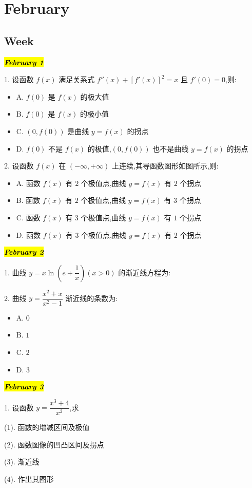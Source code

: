 \chapter{February}
\section{Week }
\hl{\textbf{\textit{February 1}}}

1. 设函数 $f(x)$ 满足关系式 $f''(x)+[f'(x)]^{2}=x$ 且 $f'(0)=0$,则:
\begin{itemize}
	\item A. $f(0)$ 是 $f(x)$ 的极大值
	\item B. $f(0)$ 是 $f(x)$ 的极小值
	\item C. $(0,f(0))$ 是曲线 $y=f(x)$ 的拐点
	\item D. $f(0)$ 不是 $f(x)$ 的极值,$(0,f(0))$ 也不是曲线 $y=f(x)$ 的拐点
\end{itemize}

2. 设函数 $f(x)$ 在 $(-\infty,+\infty)$ 上连续,其导函数图形如图所示,则:
\begin{itemize}
	\item A. 函数 $f(x)$ 有 $2$ 个极值点,曲线 $y=f(x)$ 有 $2$ 个拐点
	\item B. 函数 $f(x)$ 有 $2$ 个极值点,曲线 $y=f(x)$ 有 $3$ 个拐点
	\item C. 函数 $f(x)$ 有 $3$ 个极值点,曲线 $y=f(x)$ 有 $1$ 个拐点
	\item D. 函数 $f(x)$ 有 $3$ 个极值点,曲线 $y=f(x)$ 有 $2$ 个拐点
\end{itemize}
\hl{\textbf{\textit{February 2}}}

1. 曲线 $y=x\ln\left( e+\dfrac{1}{x}\right)(x>0) $ 的渐近线方程为:

2. 曲线 $y=\dfrac{x^{2}+x}{x^{2}-1}$ 渐近线的条数为:
\begin{itemize}
	\item A. $0$
	\item B. $1$
	\item C. $2$
	\item D. $3$
\end{itemize}
\hl{\textbf{\textit{February 3}}}

1. 设函数 $y=\dfrac{x^{3}+4}{x^{2}}$,求

(1). 函数的增减区间及极值

(2). 函数图像的凹凸区间及拐点

(3). 渐近线

(4). 作出其图形

